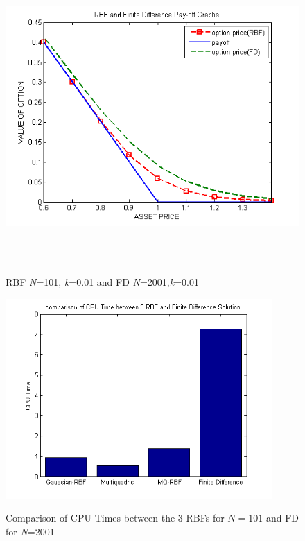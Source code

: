 \documentclass[12pt]{article}
\numberwithin{equation}{subsection} %
\begin{document}
\newpage
\begin{figure}
\begin{center}
\includegraphics[height=4in]{rbffd101.png}\
\end{center}
\vspace{-0.5in}
 \caption{RBF \textit{N}=101, \textit{k}=0.01 and FD
\textit{N}=2001,\textit{k}=0.01 }
\end{figure}

 \begin{figure}[h]
\begin{center}
\includegraphics[height=3in]{cpue10000.png}\
\end{center}
\vspace{-0.5in} \caption{Comparison of CPU Times between the 3 RBFs
for $N=101$ and FD for \textit{N}=2001 }
\end{figure}
\end{document}
